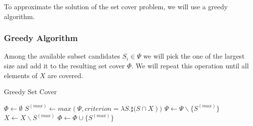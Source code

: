 \documentclass[10pt]{bmc_article}
\newenvironment{bmcformat}{\baselineskip20pt\sloppy\setboolean{publ}{false}}{\baselineskip20pt\sloppy}
\begin{document}
\begin{bmcformat}
To approximate the solution of the set cover problem, we will use a greedy algorithm.

\subsubsection*{Greedy Algorithm}
Among the available subset candidates $S_i \in \Psi$ we will pick the one of the largest size and add it to the resulting set cover $\Phi$. We will repeat this operation until all elements of $X$ are covered. \\

\begin{algorithm}[H]
\SetAlgoVlined
{}
\caption{Greedy Set Cover}
\BlankLine
\BlankLine
$\Phi \leftarrow \emptyset$ 
\BlankLine
\BlankLine
{} {
	$S^{(max)} \leftarrow max(\Psi, criterion=\lambda{S}.\sharp{(S\cap{X}}))$ \;
	\BlankLine
	$\Psi \leftarrow \Psi\backslash\{S^{(max)}\}$ \;
	$X \leftarrow X\backslash{S^{(max)}}$ \;
	$\Phi \leftarrow \Phi\cup\{S^{(max)}\}$ \;
}
\BlankLine
\KwRet{$\Phi$}
\end{algorithm} 


\end{bmcformat}
\end{document}
